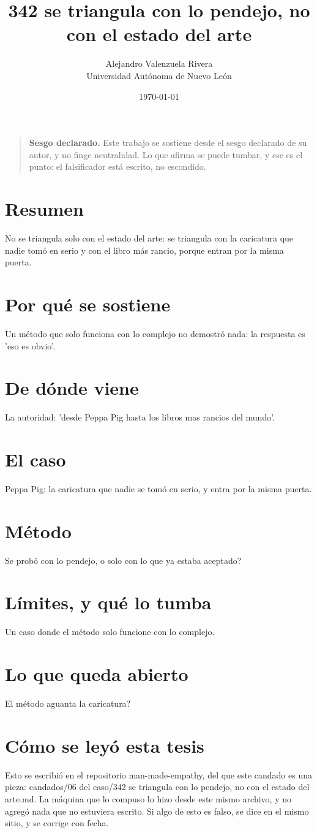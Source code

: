 \documentclass[11pt,a4paper]{article}
\title{342 se triangula con lo pendejo, no con el estado del arte}
\author{Alejandro Valenzuela Rivera\\\small Universidad Autónoma de Nuevo León}
\date{\today}
\begin{document}
\maketitle

\begin{quote}
\textbf{Sesgo declarado.} Este trabajo se sostiene desde el sesgo declarado de su autor, y no finge neutralidad. Lo que afirma se puede tumbar, y ese es el punto: el falsificador está escrito, no escondido.
\end{quote}

\section*{Resumen}
No se triangula solo con el estado del arte: se triangula con la caricatura que nadie tomó en serio y con el libro más rancio, porque entran por la misma puerta.

\section{Por qué se sostiene}
Un método que solo funciona con lo complejo no demostró nada: la respuesta es 'eso es obvio'.

\section{De dónde viene}
La autoridad: 'desde Peppa Pig hasta los libros mas rancios del mundo'.

\section{El caso}
Peppa Pig: la caricatura que nadie se tomó en serio, y entra por la misma puerta.

\section{Método}
\textquestiondown{}Se probó con lo pendejo, o solo con lo que ya estaba aceptado?

\section{Límites, y qué lo tumba}
Un caso donde el método solo funcione con lo complejo.

\section{Lo que queda abierto}
\textquestiondown{}El método aguanta la caricatura?

\section*{Cómo se leyó esta tesis}
Esto se escribió en el repositorio man-made-empathy, del que este candado es una pieza: candados/06 del caso/342 se triangula con lo pendejo, no con el estado del arte.md. La máquina que lo compuso lo hizo desde este mismo archivo, y no agregó nada que no estuviera escrito. Si algo de esto es falso, se dice en el mismo sitio, y se corrige con fecha.
\end{document}

